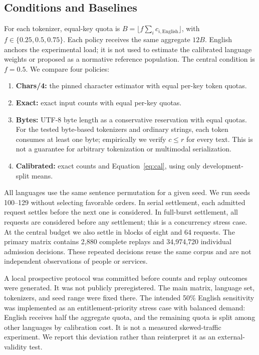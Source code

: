 \documentclass[manuscript,screen]{acmart}
\begin{document}
\subsection{Conditions and Baselines}
For each tokenizer, equal-key quota is $B=\lfloor f\sum_i c_{i,\mathrm{English}}\rfloor$, with $f\in\{0.25,0.5,0.75\}$. Each policy receives the same aggregate $12B$. English anchors the experimental load; it is not used to estimate the calibrated language weights or proposed as a normative reference population. The central condition is $f=0.5$. We compare four policies:
\begin{enumerate}
\item \textbf{Chars/4:} the pinned character estimator with equal per-key token quotas.
\item \textbf{Exact:} exact input counts with equal per-key quotas.
\item \textbf{Bytes:} UTF-8 byte length as a conservative reservation with equal quotas. For the tested byte-based tokenizers and ordinary strings, each token consumes at least one byte; empirically we verify $c\leq r$ for every text. This is not a guarantee for arbitrary tokenization or multimodal serialization.
\item \textbf{Calibrated:} exact counts and Equation~\eqref{eq:cal}, using only development-split means.
\end{enumerate}

All languages use the same sentence permutation for a given seed. We run seeds 100--129 without selecting favorable orders. In serial settlement, each admitted request settles before the next one is considered. In full-burst settlement, all requests are considered before any settlement; this is a concurrency stress case. At the central budget we also settle in blocks of eight and 64 requests. The primary matrix contains 2,880 complete replays and 34,974,720 individual admission decisions. These repeated decisions reuse the same corpus and are not independent observations of people or services.

A local prospective protocol was committed before counts and replay outcomes were generated. It was not publicly preregistered. The main matrix, language set, tokenizers, and seed range were fixed there. The intended 50\% English sensitivity was implemented as an entitlement-priority stress case with balanced demand: English receives half the aggregate quota, and the remaining quota is split among other languages by calibration cost. It is not a measured skewed-traffic experiment. We report this deviation rather than reinterpret it as an external-validity test.
\end{document}
